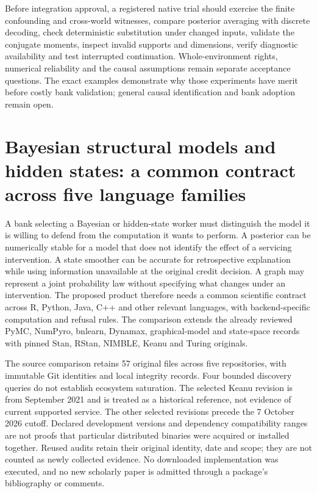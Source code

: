Before integration approval, a registered native trial should exercise the finite confounding and cross-world witnesses, compare posterior averaging with discrete decoding, check deterministic substitution under changed inputs, validate the conjugate moments, inspect invalid supports and dimensions, verify diagnostic availability and test interrupted continuation. Whole-environment rights, numerical reliability and the causal assumptions remain separate acceptance questions. The exact examples demonstrate why those experiments have merit before costly bank validation; general causal identification and bank adoption remain open. \cite{exec23_numpyro_sources,exec23_numpyro_reference}


\section[Bayesian SCM and hidden-state workers]{Bayesian structural models and hidden states: a common contract across five language families}
\label{sec:exec25-bsw}

A bank selecting a Bayesian or hidden-state worker must distinguish the model it is willing to defend from the computation it wants to perform. A posterior can be numerically stable for a model that does not identify the effect of a servicing intervention. A state smoother can be accurate for retrospective explanation while using information unavailable at the original credit decision. A graph may represent a joint probability law without specifying what changes under an intervention. The proposed product therefore needs a common scientific contract across R, Python, Java, C++ and other relevant languages, with backend-specific computation and refusal rules. The comparison extends the already reviewed PyMC, NumPyro, bnlearn, Dynamax, graphical-model and state-space records with pinned Stan, RStan, NIMBLE, Keanu and Turing originals.~\citep{exec23_pymc_sources,exec23_numpyro_sources,exec24_bnlearn_sources,exec19_dynamax_source,exec24_libdai_source,exec24_opengm_source,exec25_bsw_stan,exec25_bsw_rstan,exec25_bsw_nimble,exec25_bsw_keanu,exec25_bsw_turing,exec25_bsw_choice}

The source comparison retains 57 original files across five repositories, with immutable Git identities and local integrity records. Four bounded discovery queries do not establish ecosystem saturation. The selected Keanu revision is from September 2021 and is treated as a historical reference, not evidence of current supported service. The other selected revisions precede the 7 October 2026 cutoff. Declared development versions and dependency compatibility ranges are not proofs that particular distributed binaries were acquired or installed together. Reused audits retain their original identity, date and scope; they are not counted as newly collected evidence. No downloaded implementation was executed, and no new scholarly paper is admitted through a package's bibliography or comments.~\citep{exec25_bsw_choice}

